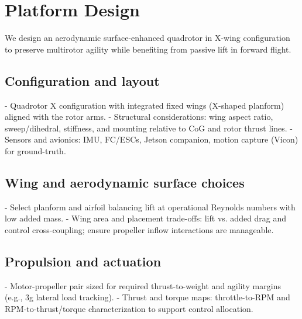 
\chapter{Platform Design}\label{chapter:platform-design}

We design an aerodynamic surface-enhanced quadrotor in X-wing configuration to preserve multirotor agility while benefiting from passive lift in forward flight.

\section{Configuration and layout}
- Quadrotor X configuration with integrated fixed wings (X-shaped planform) aligned with the rotor arms.
- Structural considerations: wing aspect ratio, sweep/dihedral, stiffness, and mounting relative to CoG and rotor thrust lines.
- Sensors and avionics: IMU, FC/ESCs, Jetson companion, motion capture (Vicon) for ground-truth.

\section{Wing and aerodynamic surface choices}
- Select planform and airfoil balancing lift at operational Reynolds numbers with low added mass.
- Wing area and placement trade-offs: lift vs. added drag and control cross-coupling; ensure propeller inflow interactions are manageable.

\section{Propulsion and actuation}
- Motor-propeller pair sized for required thrust-to-weight and agility margins (e.g., 3g lateral load tracking).
- Thrust and torque maps: throttle-to-RPM and RPM-to-thrust/torque characterization to support control allocation.
